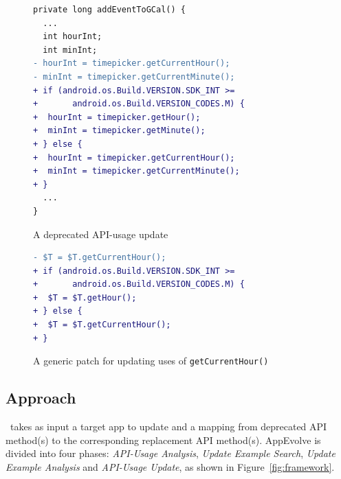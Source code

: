 \begin{figure}[htb]
\centering
\begin{lstlisting}[language=diff,numbers=none]
private long addEventToGCal() {
  ...
  int hourInt;
  int minInt;
- hourInt = timepicker.getCurrentHour();
- minInt = timepicker.getCurrentMinute();
+ if (android.os.Build.VERSION.SDK_INT >= 
+       android.os.Build.VERSION_CODES.M) {
+  hourInt = timepicker.getHour();
+  minInt = timepicker.getMinute();
+ } else {
+  hourInt = timepicker.getCurrentHour();
+  minInt = timepicker.getCurrentMinute();
+ }
  ...
}
\end{lstlisting}
\caption{A deprecated API-usage update}
\label{fig:deprecated_api_update_example}
\end{figure}

\begin{figure}[htb]
\centering
\begin{lstlisting}[language=diff,numbers=none]
- $T = $T.getCurrentHour();
+ if (android.os.Build.VERSION.SDK_INT >= 
+       android.os.Build.VERSION_CODES.M) {
+  $T = $T.getHour();
+ } else {
+  $T = $T.getCurrentHour();
+ }
\end{lstlisting}
\caption{A generic patch for updating uses of \texttt{getCurrentHour()}}
\label{fig:deprecated_api_update_edits}
\end{figure}


\subsection{Approach}
\toolname\ takes as input a target app to update and a mapping from
deprecated API method(s) to the corresponding replacement API method(s).
AppEvolve is divided into four phases: {\em API-Usage Analysis}, {\em
  Update Example Search}, {\em Update Example Analysis} and {\em API-Usage
  Update}, as shown in Figure~\ref{fig:framework}.

